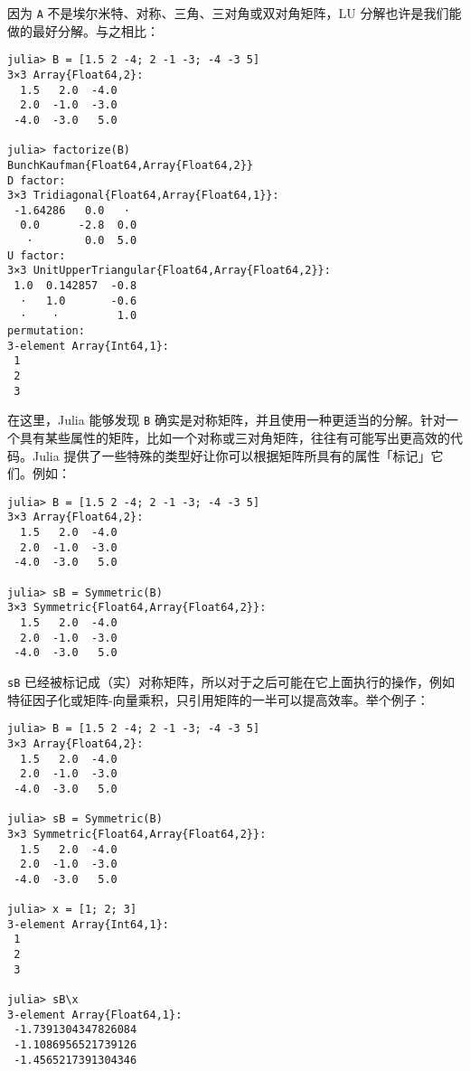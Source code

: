 因为 \texttt{A} 不是埃尔米特、对称、三角、三对角或双对角矩阵，LU 分解也许是我们能做的最好分解。与之相比：




\begin{verbatim}
julia> B = [1.5 2 -4; 2 -1 -3; -4 -3 5]
3×3 Array{Float64,2}:
  1.5   2.0  -4.0
  2.0  -1.0  -3.0
 -4.0  -3.0   5.0

julia> factorize(B)
BunchKaufman{Float64,Array{Float64,2}}
D factor:
3×3 Tridiagonal{Float64,Array{Float64,1}}:
 -1.64286   0.0   ⋅
  0.0      -2.8  0.0
   ⋅        0.0  5.0
U factor:
3×3 UnitUpperTriangular{Float64,Array{Float64,2}}:
 1.0  0.142857  -0.8
  ⋅   1.0       -0.6
  ⋅    ⋅         1.0
permutation:
3-element Array{Int64,1}:
 1
 2
 3
\end{verbatim}



在这里，Julia 能够发现 \texttt{B} 确实是对称矩阵，并且使用一种更适当的分解。针对一个具有某些属性的矩阵，比如一个对称或三对角矩阵，往往有可能写出更高效的代码。Julia 提供了一些特殊的类型好让你可以根据矩阵所具有的属性「标记」它们。例如：




\begin{verbatim}
julia> B = [1.5 2 -4; 2 -1 -3; -4 -3 5]
3×3 Array{Float64,2}:
  1.5   2.0  -4.0
  2.0  -1.0  -3.0
 -4.0  -3.0   5.0

julia> sB = Symmetric(B)
3×3 Symmetric{Float64,Array{Float64,2}}:
  1.5   2.0  -4.0
  2.0  -1.0  -3.0
 -4.0  -3.0   5.0
\end{verbatim}



\texttt{sB} 已经被标记成（实）对称矩阵，所以对于之后可能在它上面执行的操作，例如特征因子化或矩阵-向量乘积，只引用矩阵的一半可以提高效率。举个例子：




\begin{verbatim}
julia> B = [1.5 2 -4; 2 -1 -3; -4 -3 5]
3×3 Array{Float64,2}:
  1.5   2.0  -4.0
  2.0  -1.0  -3.0
 -4.0  -3.0   5.0

julia> sB = Symmetric(B)
3×3 Symmetric{Float64,Array{Float64,2}}:
  1.5   2.0  -4.0
  2.0  -1.0  -3.0
 -4.0  -3.0   5.0

julia> x = [1; 2; 3]
3-element Array{Int64,1}:
 1
 2
 3

julia> sB\x
3-element Array{Float64,1}:
 -1.7391304347826084
 -1.1086956521739126
 -1.4565217391304346
\end{verbatim}



